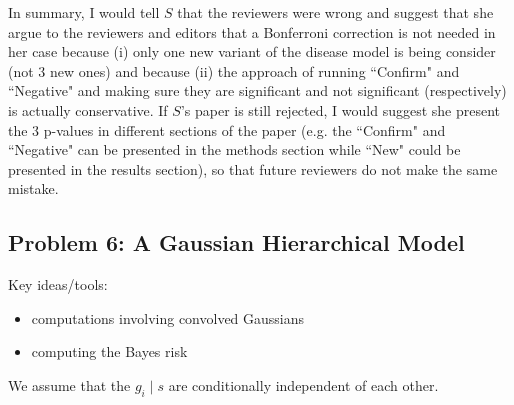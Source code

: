In summary, I would tell $S$ that the reviewers were wrong and suggest that she argue to the reviewers and editors that a Bonferroni correction is not needed in her case because (i) only one new variant of the disease model is being consider (not 3 new ones) and because (ii) the approach of running ``Confirm" and ``Negative" and making sure they are significant and not significant (respectively) is actually conservative. If $S$'s paper is still rejected, I would suggest she present the 3 p-values in different sections of the paper (e.g. the ``Confirm" and ``Negative" can be presented in the methods section while ``New" could be presented in the results section), so that future reviewers do not make the same mistake.

\subsection*{Problem 6: A Gaussian Hierarchical Model}
Key ideas/tools:
\begin{itemize}
\item computations involving convolved Gaussians
\item computing the Bayes risk
\end{itemize}

We assume that the $g_i \mid s$ are conditionally independent of each other.

